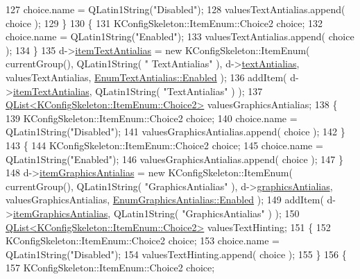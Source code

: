\begin{DoxyCode}
127     choice.name = QLatin1String(\textcolor{stringliteral}{"Disabled"});
128     valuesTextAntialias.append( choice );
129   \}
130   \{
131     KConfigSkeleton::ItemEnum::Choice2 choice;
132     choice.name = QLatin1String(\textcolor{stringliteral}{"Enabled"});
133     valuesTextAntialias.append( choice );
134   \}
135   d->\hyperlink{classOkular_1_1SettingsCorePrivate_aa4e6e995b9745ec8aebb6a33674cca51}{itemTextAntialias} = \textcolor{keyword}{new} KConfigSkeleton::ItemEnum( currentGroup(), QLatin1String( \textcolor{stringliteral}{"
      TextAntialias"} ), d->\hyperlink{classOkular_1_1SettingsCorePrivate_aabfb8b6638886cf90ebb5da026e64f50}{textAntialias}, valuesTextAntialias, 
      \hyperlink{classOkular_1_1SettingsCore_1_1EnumTextAntialias_a7609fd32c2acd57b5d3ce4ac3b01a9e4ab833e0a93d6d598e69c7fc84b5a134a1}{EnumTextAntialias::Enabled} );
136   addItem( d->\hyperlink{classOkular_1_1SettingsCorePrivate_aa4e6e995b9745ec8aebb6a33674cca51}{itemTextAntialias}, QLatin1String( \textcolor{stringliteral}{"TextAntialias"} ) );
137   \hyperlink{classQList}{QList<KConfigSkeleton::ItemEnum::Choice2>} 
      valuesGraphicsAntialias;
138   \{
139     KConfigSkeleton::ItemEnum::Choice2 choice;
140     choice.name = QLatin1String(\textcolor{stringliteral}{"Disabled"});
141     valuesGraphicsAntialias.append( choice );
142   \}
143   \{
144     KConfigSkeleton::ItemEnum::Choice2 choice;
145     choice.name = QLatin1String(\textcolor{stringliteral}{"Enabled"});
146     valuesGraphicsAntialias.append( choice );
147   \}
148   d->\hyperlink{classOkular_1_1SettingsCorePrivate_adcf521e8a4539ff836c4f48c5a09a472}{itemGraphicsAntialias} = \textcolor{keyword}{new} KConfigSkeleton::ItemEnum( currentGroup(), 
      QLatin1String( \textcolor{stringliteral}{"GraphicsAntialias"} ), d->\hyperlink{classOkular_1_1SettingsCorePrivate_a7c39944a883c59a551e351d7d4260b6f}{graphicsAntialias}, valuesGraphicsAntialias, 
      \hyperlink{classOkular_1_1SettingsCore_1_1EnumGraphicsAntialias_a124c4398a0feb1b529fbae0accbc89cead7142b8fc6f562d888be519480612e7c}{EnumGraphicsAntialias::Enabled} );
149   addItem( d->\hyperlink{classOkular_1_1SettingsCorePrivate_adcf521e8a4539ff836c4f48c5a09a472}{itemGraphicsAntialias}, QLatin1String( \textcolor{stringliteral}{"GraphicsAntialias"} ) );
150   \hyperlink{classQList}{QList<KConfigSkeleton::ItemEnum::Choice2>} valuesTextHinting;
151   \{
152     KConfigSkeleton::ItemEnum::Choice2 choice;
153     choice.name = QLatin1String(\textcolor{stringliteral}{"Disabled"});
154     valuesTextHinting.append( choice );
155   \}
156   \{
157     KConfigSkeleton::ItemEnum::Choice2 choice;

\end{DoxyCode}
